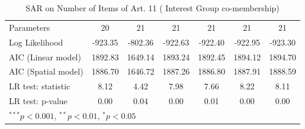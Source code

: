 \begin{table}[!h]
\begin{center}
\begin{tabular}{l c c c c c c }
Parameters              & 20           & 21           & 21           & 21           & 21           & 21           \\
Log Likelihood          & -923.35      & -802.36      & -922.63      & -922.40      & -922.95      & -923.30      \\
AIC (Linear model)      & 1892.83      & 1649.14      & 1893.24      & 1892.45      & 1894.12      & 1894.70      \\
AIC (Spatial model)     & 1886.70      & 1646.72      & 1887.26      & 1886.80      & 1887.91      & 1888.59      \\
LR test: statistic      & 8.12         & 4.42         & 7.98         & 7.66         & 8.22         & 8.11         \\
LR test: p-value        & 0.00         & 0.04         & 0.00         & 0.01         & 0.00         & 0.00         \\
\bottomrule
\multicolumn{7}{l}{\scriptsize{$^{***}p<0.001$, $^{**}p<0.01$, $^*p<0.05$}}
\end{tabular}
\caption{SAR on Number of Items of Art. 11 ( Interest Group co-membership)}
\label{table:coefficients}
\end{center}
\end{table}
